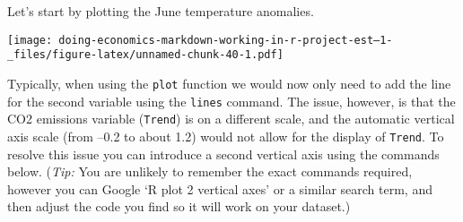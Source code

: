 \documentclass[
]{article}
\newenvironment{Shaded}{\begin{snugshade}}{\end{snugshade}}
\newcommand{\AttributeTok}[1]{\textcolor[rgb]{0.13,0.29,0.53}{#1}}
\newcommand{\DecValTok}[1]{\textcolor[rgb]{0.00,0.00,0.81}{#1}}
\newcommand{\FunctionTok}[1]{\textcolor[rgb]{0.13,0.29,0.53}{\textbf{#1}}}
\newcommand{\NormalTok}[1]{#1}
\newcommand{\OtherTok}[1]{\textcolor[rgb]{0.56,0.35,0.01}{#1}}
\newcommand{\SpecialCharTok}[1]{\textcolor[rgb]{0.81,0.36,0.00}{\textbf{#1}}}
\newcommand{\StringTok}[1]{\textcolor[rgb]{0.31,0.60,0.02}{#1}}
\begin{document}
\begin{Shaded}
\end{Shaded}

Let's start by plotting the June temperature anomalies.

\begin{Shaded}
\end{Shaded}

\texttt{[image: doing-economics-markdown-working-in-r-project-est--1-\_files/figure-latex/unnamed-chunk-40-1.pdf]}

Typically, when using the \texttt{plot} function we would now only need
to add the line for the second variable using the \texttt{lines}
command. The issue, however, is that the CO2 emissions variable
(\texttt{Trend}) is on a different scale, and the automatic vertical
axis scale (from --0.2 to about 1.2) would not allow for the display of
\texttt{Trend}. To resolve this issue you can introduce a second
vertical axis using the commands below. (\emph{Tip:} You are unlikely to
remember the exact commands required, however you can Google `R plot 2
vertical axes' or a similar search term, and then adjust the code you
find so it will work on your dataset.)
\end{document}
